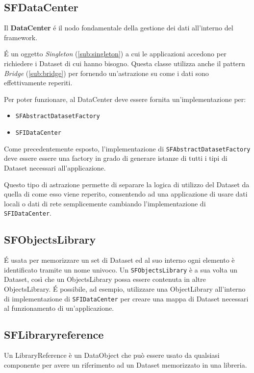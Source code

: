\subsection{SFDataCenter}
\label{sub:sfdatacenter} 
Il \textbf{DataCenter} é il nodo fondamentale della gestione dei dati all'interno del framework. 

É un oggetto \textit{Singleton} (\ref{sub:singleton}) a cui le applicazioni accedono per richiedere i Dataset di cui hanno bisogno. Questa classe utilizza anche il pattern \textit{Bridge} (\ref{sub:bridge}) per fornendo un'astrazione su come i dati sono effettivamente reperiti.

Per poter funzionare, al DataCenter deve essere fornita un'implementazione per:
\begin{itemize}
	\item \texttt{SFAbstractDatasetFactory}
	\item \texttt{SFIDataCenter}
\end{itemize}

Come precedentemente esposto, l'implementazione di \texttt{SFAbstractDatasetFactory} deve essere essere una factory in grado di generare istanze di tutti i tipi di Dataset necessari all'applicazione.

Questo tipo di astrazione permette di separare la logica di utilizzo del Dataset da quella di come esso viene reperito, consentendo ad una applicazione di usare dati locali o dati di rete semplicemente cambiando l'implementazione di \texttt{SFIDataCenter}.

\subsection{SFObjectsLibrary}
\label{sub:sfobjectslibrary}
É usata per memorizzare un set di Dataset ed al suo interno ogni elemento è identificato tramite un nome univoco.
Un \texttt{SFObjectsLibrary} è a sua volta un Dataset, così che un ObjectsLibrary possa essere contenuta in altre ObjectsLibrary.
É possibile, ad esempio, utilizzare una ObjectLibrary all'interno di implementazione di \texttt{SFIDataCenter} per creare una mappa di Dataset necessari al funzionamento di un'applicazione.

\subsection{SFLibraryreference}
\label{sub:sflibraryreference}
Un LibraryReference è un DataObject che può essere usato da qualsiasi componente per avere un riferimento ad un Dataset memorizzato in una libreria.
